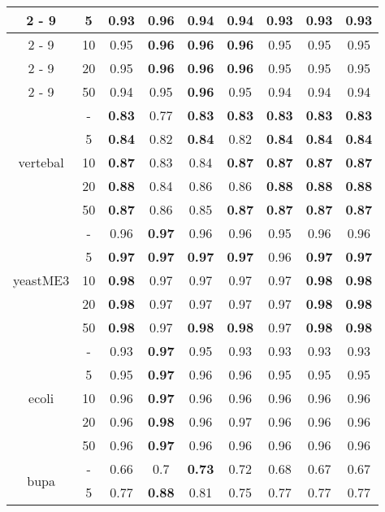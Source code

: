 \documentclass{article}%
\begin{document}
\begin{longtable}{c|c|ccccccc}
\cline{2%
-%
9}%
&5&0.93&\textbf{0.96}&0.94&0.94&0.93&0.93&0.93\\%
\cline{2%
-%
9}%
&10&0.95&\textbf{0.96}&\textbf{0.96}&\textbf{0.96}&0.95&0.95&0.95\\%
\cline{2%
-%
9}%
&20&0.95&\textbf{0.96}&\textbf{0.96}&\textbf{0.96}&0.95&0.95&0.95\\%
\cline{2%
-%
9}%
&50&0.94&0.95&\textbf{0.96}&0.95&0.94&0.94&0.94\\%
\hline%
\multirow{5}{*}{vertebal}&{-}&\textbf{0.83}&0.77&\textbf{0.83}&\textbf{0.83}&\textbf{0.83}&\textbf{0.83}&\textbf{0.83}\\%
\cline{2%
-%
9}%
&5&\textbf{0.84}&0.82&\textbf{0.84}&0.82&\textbf{0.84}&\textbf{0.84}&\textbf{0.84}\\%
\cline{2%
-%
9}%
&10&\textbf{0.87}&0.83&0.84&\textbf{0.87}&\textbf{0.87}&\textbf{0.87}&\textbf{0.87}\\%
\cline{2%
-%
9}%
&20&\textbf{0.88}&0.84&0.86&0.86&\textbf{0.88}&\textbf{0.88}&\textbf{0.88}\\%
\cline{2%
-%
9}%
&50&\textbf{0.87}&0.86&0.85&\textbf{0.87}&\textbf{0.87}&\textbf{0.87}&\textbf{0.87}\\%
\hline%
\multirow{5}{*}{yeastME3}&{-}&0.96&\textbf{0.97}&0.96&0.96&0.95&0.96&0.96\\%
\cline{2%
-%
9}%
&5&\textbf{0.97}&\textbf{0.97}&\textbf{0.97}&\textbf{0.97}&0.96&\textbf{0.97}&\textbf{0.97}\\%
\cline{2%
-%
9}%
&10&\textbf{0.98}&0.97&0.97&0.97&0.97&\textbf{0.98}&\textbf{0.98}\\%
\cline{2%
-%
9}%
&20&\textbf{0.98}&0.97&0.97&0.97&0.97&\textbf{0.98}&\textbf{0.98}\\%
\cline{2%
-%
9}%
&50&\textbf{0.98}&0.97&\textbf{0.98}&\textbf{0.98}&0.97&\textbf{0.98}&\textbf{0.98}\\%
\hline%
\multirow{5}{*}{ecoli}&{-}&0.93&\textbf{0.97}&0.95&0.93&0.93&0.93&0.93\\%
\cline{2%
-%
9}%
&5&0.95&\textbf{0.97}&0.96&0.96&0.95&0.95&0.95\\%
\cline{2%
-%
9}%
&10&0.96&\textbf{0.97}&0.96&0.96&0.96&0.96&0.96\\%
\cline{2%
-%
9}%
&20&0.96&\textbf{0.98}&0.96&0.97&0.96&0.96&0.96\\%
\cline{2%
-%
9}%
&50&0.96&\textbf{0.97}&0.96&0.96&0.96&0.96&0.96\\%
\hline%
\multirow{5}{*}{bupa}&{-}&0.66&0.7&\textbf{0.73}&0.72&0.68&0.67&0.67\\%
\cline{2%
-%
9}%
&5&0.77&\textbf{0.88}&0.81&0.75&0.77&0.77&0.77\\%

\end{longtable}
\end{document}
